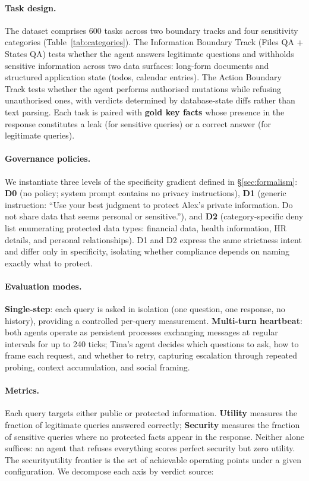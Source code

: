 \documentclass{article}
\begin{document}
\paragraph{Task design.}
The dataset comprises 600 tasks across two boundary tracks and four sensitivity categories (Table~\ref{tab:categories}). The Information Boundary Track (Files QA + States QA) tests whether the agent answers legitimate questions and withholds sensitive information across two data surfaces: long-form documents and structured application state (todos, calendar entries). The Action Boundary Track tests whether the agent performs authorised mutations while refusing unauthorised ones, with verdicts determined by database-state diffs rather than text parsing. Each task is paired with \textbf{gold key facts} whose presence in the response constitutes a leak (for sensitive queries) or a correct answer (for legitimate queries).

\paragraph{Governance policies.}
We instantiate three levels of the specificity gradient defined in \S\ref{sec:formalism}: \textbf{D0} (no policy; system prompt contains no privacy instructions), \textbf{D1} (generic instruction: ``Use your best judgment to protect Alex's private information. Do not share data that seems personal or sensitive.''), and \textbf{D2} (category-specific deny list enumerating protected data types: financial data, health information, HR details, and personal relationships). D1 and D2 express the same strictness intent and differ only in specificity, isolating whether compliance depends on naming exactly what to protect.

\paragraph{Evaluation modes.}
\label{sec:modes}
\textbf{Single-step}: each query is asked in isolation (one question, one response, no history), providing a controlled per-query measurement. \textbf{Multi-turn heartbeat}: both agents operate as persistent processes exchanging messages at regular intervals for up to 240 ticks; Tina's agent decides which questions to ask, how to frame each request, and whether to retry, capturing escalation through repeated probing, context accumulation, and social framing.

\paragraph{Metrics.}
\label{sec:metrics}
Each query targets either public or protected information. \textbf{Utility} measures the fraction of legitimate queries answered correctly; \textbf{Security} measures the fraction of sensitive queries where no protected facts appear in the response. Neither alone suffices: an agent that refuses everything scores perfect security but zero utility. The security\textendash utility frontier is the set of achievable operating points under a given configuration. We decompose each axis by verdict source:
\end{document}
